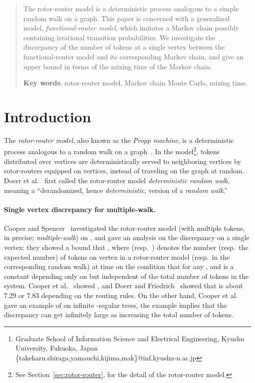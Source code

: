 \documentclass[letter, 11pt]{article}
\author{
 Takeharu Shiraga\footnote{
   Graduate School of Information Science and Electrical Engineering, 
   Kyushu University, Fukuoka, Japan\protect\\ 
{\ttfamily \{takeharu.shiraga,yamauchi,kijima,mak\}@inf.kyushu-u.ac.jp}} \and 
 Yukiko Yamauchi\footnotemark[1] \and 
 Shuji Kijima\footnotemark[1] \and
 Masafumi Yamashita\footnotemark[1]
}
\newcommand{\1}{\mbox{1}\hspace{-0.25em}\mbox{l}}
\begin{document}
\makeatletter
\makeatother
\maketitle
\begin{abstract}
The rotor-router model is a deterministic process analogous to a
simple random walk on a graph.
 This paper is concerned with a generalized model, {\em
functional-router model},
   which imitates a Markov chain possibly containing irrational transition probabilities.
 We investigate the discrepancy of the number of tokens at a single vertex
    between the functional-router model and its corresponding Markov chain, and 
   give an upper bound in terms of the mixing time of the Markov chain. 


\smallskip
\noindent
{\bf Key words}: 
  rotor-router model, 
  Markov chain Monte Carlo, 
  mixing time. 
\end{abstract}


\section{Introduction}
The \textit{rotor-router model}, also known as the {\em Propp machine}, 
  is a deterministic process analogous to a random walk on a graph~\cite{PDDK96, CS06, KKM12}. 
 In the model\footnote{See Section~\ref{sec:rotor-router}, for the detail of the rotor-router model. }, 
   tokens distributed over vertices are deterministically served to neighboring vertices 
    by rotor-routers equipped on vertices, instead of traveling on the graph at random. 
Doerr et al.~\cite{CDST07, DF09} first called the rotor-router model {\em deterministic random walk}, 
  meaning a ``derandomized, hence {\em deterministic}, version of a {\em random walk}.'' 


\paragraph{Single vertex discrepancy for multiple-walk.}
Cooper and Spencer~\cite{CS06} investigated 
  the rotor-router model (with multiple tokens, in precise; {\em multiple-walk}) on , and  
   gave an analysis on the discrepancy on a single vertex: 
 they showed a bound that , 
  where 
    (resp.\ ) denotes 
   the number (resp.\ the expected number) of tokens on vertex  
   in a rotor-router model (resp.\ in the corresponding random walk) at time  
   on the condition that  for any , and 
    is a constant depending only on  but independent of the total number of tokens in the system. 
 Cooper et al.~\cite{CDST07} showed , and  
 Doerr and Friedrich~\cite{DF09} showed that 
   is about 7.29 or 7.83 depending on the routing rules. 
On the other hand, 
 Cooper et al.~\cite{CDFS10} gave 
  an example of  on infinite -regular trees, 
  the example implies that the discrepancy can get infinitely large as increasing the total number of tokens. 
\end{document}
